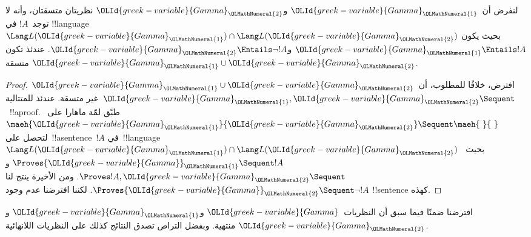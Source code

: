 \documentclass[../../../include/open-logic-section]{subfiles}
\begin{document}
\begin{thm}
لنفرض أن~${\OLId{greek-variable}{Gamma}}_{\OLMathNumeral{1}}$ و${\OLId{greek-variable}{Gamma}}_{\OLMathNumeral{2}}$ نظريتان متسقتان، وأنه لا توجد~$!A$ في
!!{language}~$\Lang L({\OLId{greek-variable}{Gamma}}_{\OLMathNumeral{1}}) \cap \Lang L({\OLId{greek-variable}{Gamma}}_{\OLMathNumeral{2}})$ بحيث يكون
${\OLId{greek-variable}{Gamma}}_{\OLMathNumeral{1}} \Entails !A$ و${\OLId{greek-variable}{Gamma}}_{\OLMathNumeral{2}} \Entails \lnot !A$. عندئذ تكون
${\OLId{greek-variable}{Gamma}}_{\OLMathNumeral{1}} \cup {\OLId{greek-variable}{Gamma}}_{\OLMathNumeral{2}}$ متسقة.
\end{thm}

\begin{proof}
  افترض، خلافًا للمطلوب، أن~${\OLId{greek-variable}{Gamma}}_{\OLMathNumeral{1}} \cup {\OLId{greek-variable}{Gamma}}_{\OLMathNumeral{2}}$ غير متسقة. عندئذ
  للمتتالية~${\OLId{greek-variable}{Gamma}}_{\OLMathNumeral{1}}, {\OLId{greek-variable}{Gamma}}_{\OLMathNumeral{2}} \Sequent \ $~!!a{proof}. طبّق لمّة
  ماهارا على~$\maeh{{\OLId{greek-variable}{Gamma}}_{\OLMathNumeral{1}}}{{\OLId{greek-variable}{Gamma}}_{\OLMathNumeral{2}}} \Sequent \maeh{\ }{\ }$
  لتحصل على~!!a{sentence}~$!A$ في~!!{language}~$\Lang L({\OLId{greek-variable}{Gamma}}_{\OLMathNumeral{1}})
  \cap \Lang L({\OLId{greek-variable}{Gamma}}_{\OLMathNumeral{2}})$ بحيث~$\Proves {\OLId{greek-variable}{Gamma}}_{\OLMathNumeral{1}} \Sequent !A$ و
  $\Proves !A, {\OLId{greek-variable}{Gamma}}_{\OLMathNumeral{2}} \Sequent \quad$. ومن الأخيرة ينتج لنا
  $\Proves {\OLId{greek-variable}{Gamma}}_{\OLMathNumeral{2}} \Sequent \lnot !A$. لكننا افترضنا عدم وجود
  !!{sentence} كهذه.
\end{proof}

افترضنا ضمنًا فيما سبق أن النظريات~${\OLId{greek-variable}{Gamma}}$ و${\OLId{greek-variable}{Gamma}}_{\OLMathNumeral{1}}$ و${\OLId{greek-variable}{Gamma}}_{\OLMathNumeral{2}}$
منتهية. وبفضل التراص تصدق النتائج كذلك على النظريات اللانهائية.
\end{document}

